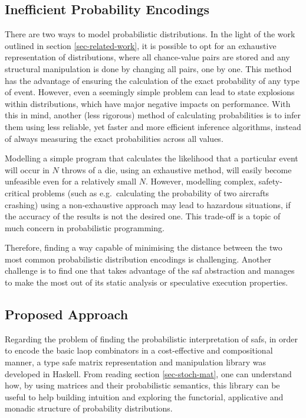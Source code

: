 \documentclass[
  oneside,
  11pt, a4paper,
  footinclude=true,
  headinclude=true,
  cleardoublepage=empty
]{scrbook}
\theoremstyle{definition}
\theoremstyle{definition}
\begin{document}
	\subsection{Inefficient Probability Encodings}

    There are two ways to model probabilistic distributions. In the light of the work outlined in section \ref{sec-related-work}, it is possible to opt for an exhaustive representation of distributions, where all chance-value pairs are stored and any structural manipulation is done by changing all pairs, one by one. This method has the advantage of ensuring the calculation of the exact probability of any type of event. However, even a seemingly simple problem can lead to state explosions within distributions, which have major negative impacts on performance. With this in mind, another (less rigorous) method of calculating probabilities is to infer them using less reliable, yet faster and more efficient inference algorithms, instead of always measuring the exact probabilities across all values.

    Modelling a simple program that calculates the likelihood that a particular event will occur in $N$ throws of a die, using an exhaustive method, will easily become unfeasible even for a relatively small $N$. However, modelling complex, safety-critical problems (such as e.g.\ calculating the probability of two aircrafts crashing) using a non-exhaustive approach may lead to hazardous situations, if the accuracy of the results is not the desired one. This trade-off is a topic of much concern in probabilistic programming. %

    Therefore, finding a way capable of minimising the distance between the two most common probabilistic distribution encodings is challenging. Another challenge is to find one that takes advantage of the \gls{saf} abstraction and manages to make the most out of its static analysis or speculative execution properties. 
	
	\subsection{Proposed Approach}\label{sec-approach}
	
	Regarding the problem of finding the probabilistic interpretation of \glspl{saf}, in order to encode the basic \gls{laop} combinators in a cost-effective and compositional manner, a type safe matrix representation and manipulation library was developed in Haskell. From reading section \ref{sec-stoch-mat}, one can understand how, by using matrices and their probabilistic semantics, this library can be useful to help building intuition and exploring the functorial, applicative and monadic structure of probability distributions.
	
\end{document}
